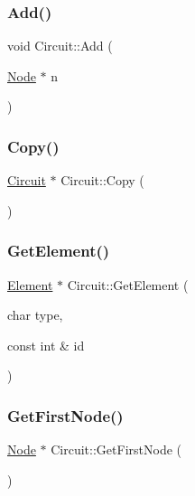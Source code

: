 \subsubsection{\texorpdfstring{Add()}{Add()}}
{\footnotesize\ttfamily void Circuit\+::\+Add (\begin{DoxyParamCaption}\item[{\hyperlink{class_node}{Node} $\ast$}]{n }\end{DoxyParamCaption})}

\mbox{\label{class_circuit_adfadd59857303052342b2b962e9b810d}} 
\subsubsection{\texorpdfstring{Copy()}{Copy()}}
{\footnotesize\ttfamily \hyperlink{class_circuit}{Circuit} $\ast$ Circuit\+::\+Copy (\begin{DoxyParamCaption}{ }\end{DoxyParamCaption})}

\mbox{\label{class_circuit_a00cc4492fc12d0df63926d66482466ed}} 
\subsubsection{\texorpdfstring{Get\+Element()}{GetElement()}}
{\footnotesize\ttfamily \hyperlink{class_element}{Element} $\ast$ Circuit\+::\+Get\+Element (\begin{DoxyParamCaption}\item[{char}]{type,  }\item[{const int \&}]{id }\end{DoxyParamCaption})}

\mbox{\label{class_circuit_aff4874c7202cfdba682aec96a9bb4079}} 
\subsubsection{\texorpdfstring{Get\+First\+Node()}{GetFirstNode()}}
{\footnotesize\ttfamily \hyperlink{class_node}{Node} $\ast$ Circuit\+::\+Get\+First\+Node (\begin{DoxyParamCaption}{ }\end{DoxyParamCaption})}

